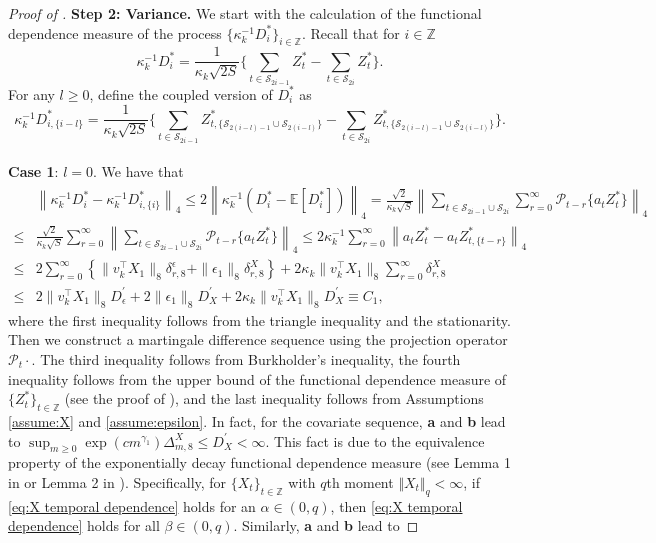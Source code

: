 \documentclass[11pt]{article}
\theoremstyle{plain}
\theoremstyle{definition}
\begin{document}
\begin{proof}[Proof of ]
{\bf Step 2: Variance.}
    We start with the calculation of the functional dependence measure of the process $\{\kappa_k^{-1}D_i^*\}_{i \in \mathbb{Z}}$. Recall that for $i \in \mathbb{Z}$
    \[
    \kappa_k^{-1}D_i^* = \frac{1}{\kappa_k\sqrt{2S}}\bigg\{\sum_{t \in \mathcal{S}_{2i-1}}Z_t^* - \sum_{t \in \mathcal{S}_{2i}}Z_t^*\bigg\}.
    \]
    For any $l \geq 0$, define the coupled version of $D_i^*$ as
    \[
    \kappa_k^{-1}D_{i,\{i-l\}}^* = \frac{1}{\kappa_k\sqrt{2S}}\bigg\{\sum_{t \in \mathcal{S}_{2i-1}}Z_{t, \{\mathcal{S}_{2(i-l)-1} \cup \mathcal{S}_{2(i-l)}\}}^* - \sum_{t \in \mathcal{S}_{2i}}Z_{t, \{\mathcal{S}_{2(i-l)-1} \cup \mathcal{S}_{2(i-l)}\}}^*\bigg\}.
    \]
    \\
    \textbf{Case 1}: $l = 0$. We have that
    \begin{align}\label{eq:D_i^*_Lq}
        &\left\|\kappa_k^{-1}D_{i}^* - \kappa_k^{-1}D_{i, \{i\}}^*\right\|_{4} \leq 2\left\|\kappa_k^{-1}(D_{i}^* - \mathbb{E}[D_i^*])\right\|_{4} = \frac{\sqrt{2}}{\kappa_k\sqrt{S}}\left\|\sum_{t \in \mathcal{S}_{2i-1} \cup \mathcal{S}_{2i}}\sum_{r = 0}^{\infty}\mathcal{P}_{t-r}\{a_tZ_{t}^*\}\right\|_{4} \nonumber\\
        \leq& \frac{\sqrt{2}}{\kappa_k\sqrt{S}}\sum_{r = 0}^{\infty}\left\|\sum_{t \in \mathcal{S}_{2i-1} \cup \mathcal{S}_{2i}}\mathcal{P}_{t-r}\{a_tZ_{t}^*\}\right\|_{4} \leq 2\kappa_k^{-1}\sum_{r = 0}^{\infty}\left\|a_tZ_{t}^* - a_tZ_{t, \{t-r\}}^*\right\|_{4} \nonumber\\
        \leq& 2\sum_{r = 0}^{\infty}\left\{\|v_k^{\top}X_1\|_{8}\delta_{r, 8}^{\epsilon} + \|\epsilon_1\|_{8}\delta_{r, 8}^{X}\right\} + 2\kappa_k\|v^{\top}_kX_1\|_{8}\sum_{r = 0}^{\infty}\delta_{r, 8}^X \nonumber\\
        \leq& 2\|v_k^{\top}X_1\|_{8}D_{\epsilon}^{\prime} + 2\|\epsilon_1\|_{8}D_{X}^{\prime} + 2\kappa_k\|v^{\top}_kX_1\|_{8}D_X^{\prime} \equiv C_1,
    \end{align}
    where the first inequality follows from the triangle inequality and the stationarity. Then we construct a martingale difference sequence using the projection operator $\mathcal{P}_t\cdot$. The third inequality follows from Burkholder's inequality, the fourth inequality follows from the upper bound of the functional dependence measure of $\{Z_t^*\}_{t \in \mathbb{Z}}$ (see the proof of ), and the last inequality follows from Assumptions \ref{assume:X} and \ref{assume:epsilon}. In fact, for the covariate sequence, \textbf{a} and \textbf{b} lead to 
    $\sup_{m \geq 0}\exp(cm^{\gamma_1})\Delta_{m,8}^X \leq D_X^{\prime} < \infty$.  This fact is due to the equivalence property of the exponentially decay functional dependence measure (see Lemma 1 in \cite{wu2004limit} or Lemma 2 in \cite{wu2005linear}). Specifically, for $\{X_{t}\}_{t \in \mathbb{Z}}$ with $q$th moment $\Vert X_t \Vert_q < \infty$, if \eqref{eq:X temporal dependence} holds for an $\alpha \in (0, q)$, then \eqref{eq:X temporal dependence} holds for all $\beta \in (0, q)$.  Similarly, \textbf{a} and \textbf{b} lead to 

\end{proof}
\end{document}
